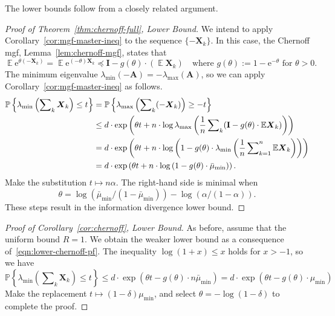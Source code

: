 \documentclass[11pt,letterpaper,twoside,reqno,draft]{amsart}
\theoremstyle{remark}
\numberwithin{equation}{section}
\numberwithin{thm}{section}
\begin{document}
The lower bounds follow from a closely related argument.

\begin{proof}[Proof of Theorem~\ref{thm:chernoff-full}, Lower Bound]
We intend to apply Corollary~\ref{cor:mgf-master-ineq} to the sequence $\{-{\bm{{X}}}_k\}$.  In this case, the Chernoff mgf, Lemma~\ref{lem:chernoff-mgf}, states that
$$
{\operatorname{\mathbb{E}}} {\mathrm{e}}^{\theta(-{\bm{{X}}}_k)}
	= {\operatorname{\mathbb{E}}} {\mathrm{e}}^{(-\theta){\bm{{X}}}_k}
	{\preccurlyeq} {\mathbf{I}} - g(\theta) \cdot ({\operatorname{\mathbb{E}}} {\bm{{X}}}_k)
	\quad\text{where $g(\theta) := 1 - {\mathrm{e}}^{-\theta}$ for $\theta > 0$.}
$$
The minimum eigenvalue $\lambda_{\min}(-{\bm{{A}}}) = - \lambda_{\max}({\bm{{A}}})$, so we can apply Corollary~\ref{cor:mgf-master-ineq} as follows.
\begin{align} \label{eqn:lower-chernoff-pf}
{\mathbb{P}\left\{ {{ \lambda_{\min}\left(\sum\nolimits_k {\bm{{X}}}_k \right) \leq t }} \right\}}
	&= {\mathbb{P}\left\{ {{ \lambda_{\max}\left(\sum\nolimits_k (- {\bm{{X}}}_k) \right) \geq -t }} \right\}} \notag \\
	&\leq d \cdot \exp\left( \theta t +
 	n \cdot \log \lambda_{\max}\left( \frac{1}{n} \sum\nolimits_k ( {\mathbf{I}} - g(\theta) \cdot
	{\operatorname{\mathbb{E}}} {\bm{{X}}}_k) \right) \right) \notag \\
	&= d \cdot \exp\left( \theta t +
	n \cdot \log\left( 1 - g(\theta) \cdot \lambda_{\min}\left(
	\frac{1}{n} \sum\nolimits_{k=1}^n {\operatorname{\mathbb{E}}} {\bm{{X}}}_k \right) \right) \right) \notag \\
	&= d \cdot \exp\left( \theta t + 
	n \cdot \log\left( 1 - g(\theta) \cdot \bar{\mu}_{\min} \right) \right).
\end{align}
Make the substitution $t \mapsto n \alpha$. The right-hand side is minimal when
$$
\theta = \log(\bar{\mu}_{\min}/(1-\bar{\mu}_{\min})) - \log(\alpha / (1 - \alpha)).
$$
These steps result in the information divergence lower bound.
\end{proof}

\begin{proof}[Proof of Corollary~\ref{cor:chernoff}, Lower Bound]
As before, assume that the uniform bound $R = 1$.  We obtain the weaker lower bound as a consequence of~\eqref{eqn:lower-chernoff-pf}.  The inequality $\log(1+x) \leq x$ holds for $x > -1$, so we have
$$
{\mathbb{P}\left\{ {{ \lambda_{\min}\left(\sum\nolimits_k {\bm{{X}}}_k \right) \leq t }} \right\}}
	\leq d \cdot \exp\left( \theta t - g(\theta) \cdot n \bar{\mu}_{\min} \right)
	= d \cdot \exp\left( \theta t - g(\theta) \cdot \mu_{\min} \right)
$$
Make the replacement $t \mapsto (1 -\delta) \mu_{\min}$, and select $\theta = -\log(1-\delta)$ to complete the proof. 
\end{proof}
\end{document}
